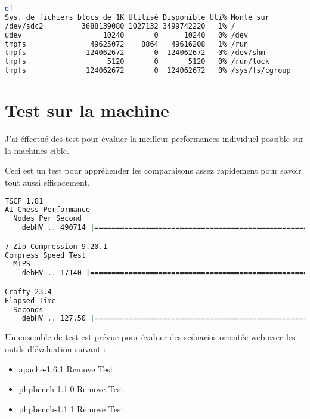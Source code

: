 \documentclass[french]{article}
\begin{document}
\begin{lstlisting}[language=bash,caption={df}]
df
Sys. de fichiers blocs de 1K Utilisé Disponible Uti% Monté sur
/dev/sdc2         3688139080 1027132 3499742220   1% /
udev                   10240       0      10240   0% /dev
tmpfs               49625072    8864   49616208   1% /run
tmpfs              124062672       0  124062672   0% /dev/shm
tmpfs                   5120       0       5120   0% /run/lock
tmpfs              124062672       0  124062672   0% /sys/fs/cgroup

\end{lstlisting}
\newpage
\section{Test sur la machine}
J'ai éffectué des test pour évaluer la meilleur performances individuel possible sur la machines cible. 

Ceci est un test pour appréhender les comparaisons assez rapidement pour savoir tout aussi efficacement.

\begin{lstlisting}[language=bash,caption={}]
TSCP 1.81
AI Chess Performance
  Nodes Per Second
    debHV .. 490714 |==========================================================

7-Zip Compression 9.20.1
Compress Speed Test
  MIPS
    debHV .. 17140 |===========================================================

Crafty 23.4
Elapsed Time
  Seconds
    debHV .. 127.50 |==========================================================


\end{lstlisting}

Un ensemble de test est prévue pour évaluer des scénarios orientée web avec les outils d'évaluation suivant : 

\begin{itemize}
\item apache-1.6.1 Remove Test
\item phpbench-1.1.0 Remove Test
\item phpbench-1.1.1 Remove Test
\end{itemize}
\newpage
\end{document}
